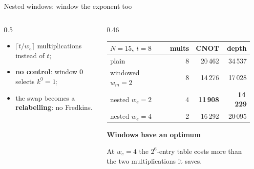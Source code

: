 \documentclass[aspectratio=169,11pt]{beamer}
\newcommand{\peachtitle}[1]{{\bfseries\color{cverm}#1}\par\vskip1mm}
\begin{document}
\begin{frame}{Nested windows: window the exponent too}
  \begin{columns}[c]
    \begin{column}{0.5\textwidth}
      \centering
      \vskip3mm
      \raggedright\small
      \begin{itemize}\setlength{\itemsep}{0.6mm}
        \item $\lceil t/w_e\rceil$ multiplications instead of $t$;
        \item \textbf{no control}: window 0 selects $k^0=1$;
        \item the swap becomes a \textbf{relabelling}: no Fredkins.
      \end{itemize}
    \end{column}
    \begin{column}{0.46\textwidth}
      \centering\footnotesize
      \renewcommand{\arraystretch}{1.1}
      \begin{tabular}{@{}lrrr@{}}
        \toprule
        $N=15$, $t=8$ & mults & CNOT & depth \\
        \midrule
        plain & 8 & 20\,462 & 34\,537 \\
        windowed $w_m=2$ & 8 & 14\,276 & 17\,028 \\
        nested $w_e=2$ & 4 & \textbf{11\,908} & \textbf{14\,229} \\
        nested $w_e=4$ & 2 & 16\,292 & 20\,095 \\
        \bottomrule
      \end{tabular}\par
      \vskip2mm
      \begin{peachblock}[fontupper=\small]\peachtitle{Windows have an optimum}
        At $w_e=4$ the $2^6$-entry table costs more than the two multiplications it saves.
      \end{peachblock}
    \end{column}
  \end{columns}
\end{frame}
\end{document}

